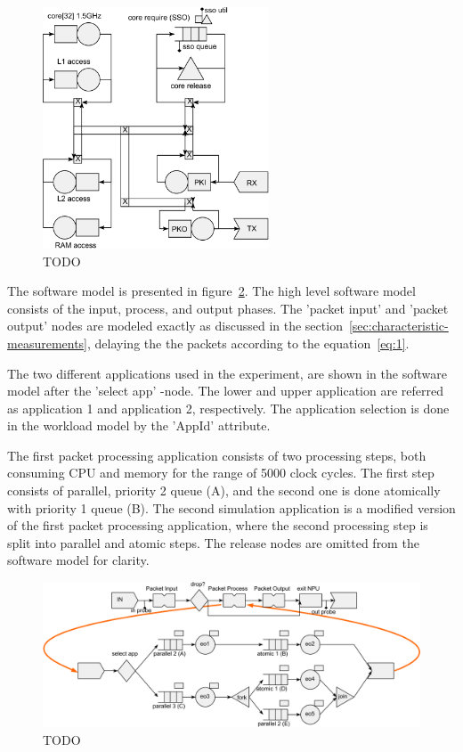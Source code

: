 \begin{figure}[]
  \begin{center}
    \includegraphics[width=0.6\textwidth]{images/pse-models/experiment-hardware.pdf}
    \caption{TODO}
    \label{fig:experiment-hardware}
  \end{center}
\end{figure}

The software model is presented in figure~\ref{fig:experiment-software}. The high level software model consists of the input, process, and output phases. The 'packet input' and 'packet output' nodes are modeled exactly as discussed in the section~\ref{sec:characteristic-measurements}, delaying the the packets according to the equation~\ref{eq:1}.

The two different applications used in the experiment, are shown in the software model after the 'select app' -node. The lower and upper application are referred as application 1 and application 2, respectively. The application selection is done in the workload model by the 'AppId' attribute.

The first packet processing application consists of two processing steps, both consuming CPU and memory for the range of 5000 clock cycles. The first step consists of parallel, priority 2 queue (A), and the second one is done atomically with priority 1 queue (B). The second simulation application is a modified version of the first packet processing application, where the second processing step is split into parallel and atomic steps. The release nodes are omitted from the software model for clarity.

\begin{figure}[]
  \begin{center}
    \includegraphics[width=\textwidth]{images/pse-models/experiment-software.pdf}
    \caption{TODO}
    \label{fig:experiment-software}
  \end{center}
\end{figure}

